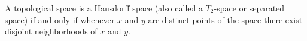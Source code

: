 A topological space is a Hausdorff space (also called a $T_2$-space or separated space) if and only if whenever $x$ and $y$ are distinct points of the space there exist disjoint neighborhoods of $x$ and $y$.
